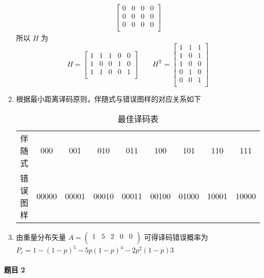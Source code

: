 \documentclass{ctexart}
\begin{document}
\begin{enumerate}
\begin{align}
\begin{bmatrix}
            0 & 0 & 0 & 0 \\
            0 & 0 & 0 & 0 \\
            0 & 0 & 0 & 0 \\
        \end{bmatrix}
    \end{align}
    所以 $H$ 为
    \begin{equation}
        H = \begin{bmatrix}
            1 & 1 & 1 & 0 & 0 \\
            1 & 0 & 0 & 1 & 0 \\
            1 & 1 & 0 & 0 & 1 \\
        \end{bmatrix}
        \qquad
        H^\mathrm{T} = \begin{bmatrix}
            1 & 1 & 1 \\
            1 & 0 & 1 \\
            1 & 0 & 0 \\
            0 & 1 & 0 \\
            0 & 0 & 1 \\
        \end{bmatrix}
    \end{equation}
    \item 根据最小距离译码原则，伴随式与错误图样的对应关系如下
    \begin{table}[H]
        \centering
        \caption{最佳译码表}
        \begin{tabular}{c|cccccccc}
            \hline
            伴随式 & 000 & 001 & 010 & 011 & 100 & 101 & 110 & 111 \\
            错误图样 & 00000 & 00001 & 00010 & 00011 & 00100 & 01000 & 10001 & 10000 \\
            \hline
        \end{tabular}
    \end{table}
    \item 由重量分布矢量 $A = \begin{pmatrix}
        1 & 5 & 2 & 0 & 0 \\
    \end{pmatrix}$ 可得译码错误概率为 $P_e = 1 - (1 - p)^5 - 5p(1 - p)^4 - 2p^2(1 - p)3$
\end{enumerate}

\paragraph{题目 2}
\end{document}
